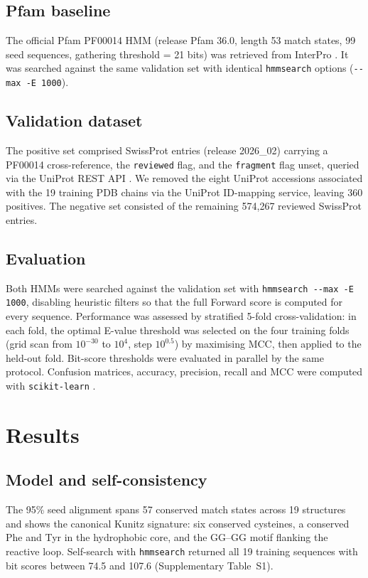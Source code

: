 \documentclass[11pt,a4paper]{article}
\begin{document}
\subsection{Pfam baseline}
The official Pfam PF00014 HMM (release Pfam 36.0, length 53 match states, 99 seed sequences, gathering threshold = 21 bits) was retrieved from InterPro \citep{paysan2023interpro}. It was searched against the same validation set with identical \texttt{hmmsearch} options (\texttt{-{}-max -E 1000}).

\subsection{Validation dataset}
The positive set comprised SwissProt entries (release 2026\_02) carrying a PF00014 cross-reference, the \texttt{reviewed} flag, and the \texttt{fragment} flag unset, queried via the UniProt REST API \citep{uniprot2023}. We removed the eight UniProt accessions associated with the 19 training PDB chains via the UniProt ID-mapping service, leaving 360 positives. The negative set consisted of the remaining 574{,}267 reviewed SwissProt entries.

\subsection{Evaluation}
Both HMMs were searched against the validation set with \texttt{hmmsearch -{}-max -E 1000}, disabling heuristic filters so that the full Forward score is computed for every sequence. Performance was assessed by stratified 5-fold cross-validation: in each fold, the optimal E-value threshold was selected on the four training folds (grid scan from $10^{-30}$ to $10^{4}$, step $10^{0.5}$) by maximising MCC, then applied to the held-out fold. Bit-score thresholds were evaluated in parallel by the same protocol. Confusion matrices, accuracy, precision, recall and MCC were computed with \texttt{scikit-learn} \citep{scikit-learn}.

\section{Results}

\subsection{Model and self-consistency}
The 95\% seed alignment spans 57 conserved match states across 19 structures and shows the canonical Kunitz signature: six conserved cysteines, a conserved Phe and Tyr in the hydrophobic core, and the GG--GG motif flanking the reactive loop. Self-search with \texttt{hmmsearch} returned all 19 training sequences with bit scores between 74.5 and 107.6 (Supplementary Table~S1).
\end{document}
